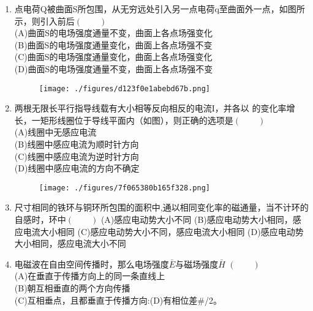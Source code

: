 \begin{enumerate}
(A)半径为R的无限长均匀带电圆柱体电场的E-r 关系\\
(B)半径为R的无限长均匀带电圆柱面电场的E-r 关系\\
(C)半径为R的均匀带正电球体电场的U-r关系\\
(D)半径为R的均匀带正电球面电场的U-r关系
\begin{figure}[ht]
\centering
\texttt{[image: ./figures/dabd5d896393286f.png]}
\caption{} \label{fig_HDSD13_3}
\end{figure}
\item 点电荷Q被曲面S所包围，从无穷远处引入另一点电荷q至曲面外一点，如图所示，则引入前后$(\qquad)$\\
(A)曲面S的电场强度通量不变，曲面上各点场强变化\\
(B)曲面S的电场强度通量变化，曲面上各点场强不变\\
(C)曲面S的电场强度通量变化，曲面上各点场强变化\\
(D)曲面S的电场强度通量不变，曲面上各点场强不变
\begin{figure}[ht]
\centering
\texttt{[image: ./figures/d123f0e1abebd67b.png]}
\caption{} \label{fig_HDSD13_2}
\end{figure}
\item 两根无限长平行指导线载有大小相等反向相反的电流I，并各以  的变化率增长，一矩形线圈位于导线平面内（如图），则正确的选项是$(\qquad)$\\
(A)线圈中无感应电流\\
(B)线圈中感应电流为顺时针方向\\
(C)线圈中感应电流为逆时针方向\\
(D)线圈中感应电流的方向不确定
\begin{figure}[ht]
\centering
\texttt{[image: ./figures/7f065380b165f328.png]}
\caption{} \label{fig_HDSD13_4}
\end{figure}
\item 尺寸相同的铁环与铜环所包围的面积中,通以相同变化率的磁通量，当不计环的自感时，环中$(\qquad)$
(A)感应电动势大小不同
(B)感应电动势大小相同，感应电流大小相同
(C)感应电动势大小不同，感应电流大小相同
(D)感应电动势大小相同，感应电流大小不同
\item 电磁波在自由空间传播时，那么电场强度$\bar E$与磁场强度$\bar H$ $(\qquad)$\\
(A)在垂直于传播方向上的同一条直线上\\
(B)朝互相垂直的两个方向传播\\
(C)互相垂点，且都垂直于传播方向:(D)有相位差#/2。
\end{enumerate}
